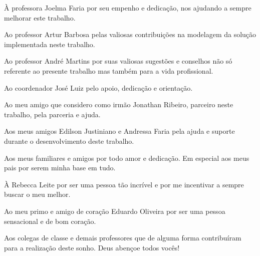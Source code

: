 \begin{agradecimentos}
\par À professora Joelma Faria por seu empenho e dedicação, nos ajudando a sempre melhorar
este trabalho.

\par Ao professor Artur Barbosa pelas valiosas contribuições na modelagem da solução implementada
neste trabalho.

\par Ao professor André Martins por suas valiosas sugestões e conselhos não só referente ao presente
trabalho mas também para a vida profissional. 

\par Ao coordenador José Luiz pelo apoio, dedicação e orientação.

\par Ao meu amigo que considero como irmão Jonathan Ribeiro, parceiro neste trabalho, pela parceria e ajuda.

\par Aos meus amigos Edilson Justiniano e Andressa Faria pela ajuda e suporte durante o desenvolvimento deste trabalho.

\par Aos meus familiares e amigos por todo amor e dedicação. Em especial aos meus pais por serem minha base em tudo.

\par À Rebecca Leite por ser uma pessoa tão incrível e por me incentivar a sempre buscar o meu melhor.

\par Ao meu primo e amigo de coração Eduardo Oliveira por ser uma pessoa sensacional e de bom coração.

\par Aos colegas de classe e demais professores que de alguma forma contribuíram para a realização deste sonho. Deus
abençoe todos vocês!

\end{agradecimentos}




